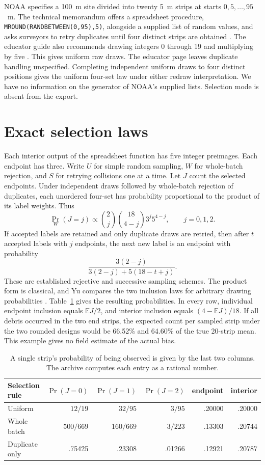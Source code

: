 \documentclass[10pt]{article}
\newcommand{\E}{\mathbb E}
\begin{document}
NOAA specifies a 100~m site divided into twenty 5~m strips at starts $0,5,\ldots,95$~m. The technical memorandum offers a spreadsheet procedure, \texttt{MROUND(RANDBETWEEN(0,95),5)}, alongside a supplied list of random values, and asks surveyors to retry duplicates until four distinct strips are obtained \cite{guide}. The educator guide also recommends drawing integers 0 through 19 and multiplying by five \cite{edu}. This gives uniform raw draws. The educator page leaves duplicate handling unspecified. Completing independent uniform draws to four distinct positions gives the uniform four-set law under either redraw interpretation. We have no information on the generator of NOAA's supplied lists. Selection mode is absent from the export.

\section{Exact selection laws}
Each interior output of the spreadsheet function has five integer preimages. Each endpoint has three. Write $U$ for simple random sampling, $W$ for whole-batch rejection, and $S$ for retrying collisions one at a time. Let $J$ count the selected endpoints. Under independent draws followed by whole-batch rejection of duplicates, each unordered four-set has probability proportional to the product of its label weights. Thus
\[
 \Pr_W(J=j)\propto {2\choose j}{18\choose 4-j}3^j5^{4-j},\qquad j=0,1,2.
\]
If accepted labels are retained and only duplicate draws are retried, then after $t$ accepted labels with $j$ endpoints, the next new label is an endpoint with probability
\[
 \frac{3(2-j)}{3(2-j)+5(18-t+j)}.
\]
These are established rejective and successive sampling schemes. The product form is classical, and Yu compares the two inclusion laws for arbitrary drawing probabilities \cite{chen,yu,fog}. Table~\ref{tab:design} gives the resulting probabilities. In every row, individual endpoint inclusion equals $\E J/2$, and interior inclusion equals $(4-\E J)/18$. If all debris occurred in the two end strips, the expected count per sampled strip under the two rounded designs would be 66.52\% and 64.60\% of the true 20-strip mean. This example gives no field estimate of the actual bias.

\begin{table}[ht]\centering\small
\begin{tabular}{lrrrrr}\toprule
Selection rule & $\Pr(J=0)$ & $\Pr(J=1)$ & $\Pr(J=2)$ & endpoint & interior\\\midrule
Uniform & $12/19$ & $32/95$ & $3/95$ & .20000 & .20000\\
Whole batch & $500/669$ & $160/669$ & $3/223$ & .13303 & .20744\\
Duplicate only & .75425 & .23308 & .01266 & .12921 & .20787\\\bottomrule
\end{tabular}
\caption{A single strip's probability of being observed is given by the last two columns. The archive computes each entry as a rational number.}\label{tab:design}
\end{table}
\end{document}
